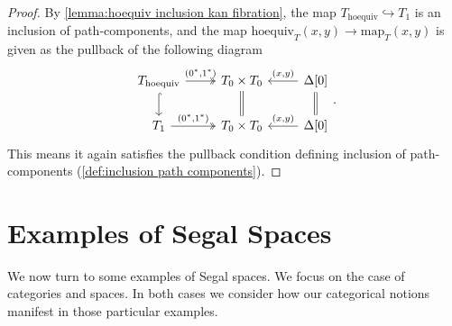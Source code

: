 \documentclass[11pt, a4paper]{amsart}
\newcommand{\map}{\mathrm{map}}
\newcommand{\hoequiv}{\mathrm{hoequiv}}
\theoremstyle{definition}
\theoremstyle{remark}
\numberwithin{equation}{section}
\begin{document}
\begin{proof}
 By \cref{lemma:hoequiv inclusion kan fibration}, the map $T_{\hoequiv} \hookrightarrow T_1$ is an inclusion of path-components, and the map $\hoequiv_{T}(x,y) \to \map_{T}(x,y)$ is given as the pullback of the following diagram
 \[
  \begin{tikzcd}
   T_{\hoequiv} \arrow[d, hookrightarrow] \arrow[r, "{(0^* , 1^*)}", twoheadrightarrow] & T_0 \times T_0 \arrow[d, equal] & \Delta[0] \arrow[l, "{(x,y)}"'] \arrow[d, equal] \\ 
   T_1 \arrow[r, "{(0^* , 1^*)}", twoheadrightarrow]  & T_0 \times T_0 & \Delta[0] \arrow[l, "{(x,y)}"']
  \end{tikzcd}.
 \] 
 This means it again satisfies the pullback condition defining inclusion of path-components (\cref{def:inclusion path components}). 
\end{proof}

\section{Examples of Segal Spaces} \label{sec:example Segal spaces}
We now turn to some examples of Segal spaces. We focus on the case of categories and spaces. In both cases we consider how our categorical notions manifest in those particular examples.
 
\end{document}
